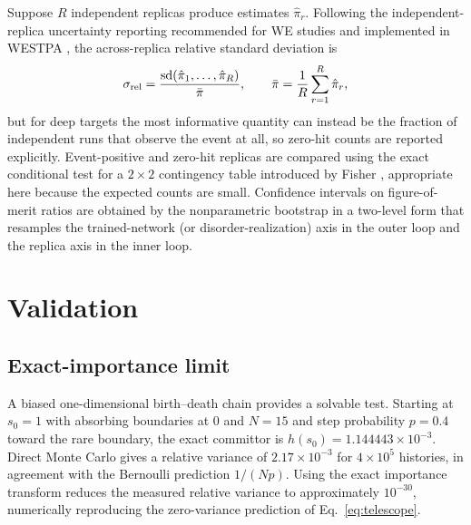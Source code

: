 \documentclass[a4paper,fleqn]{cas-sc}
\begin{document}
Suppose $R$ independent replicas produce estimates $\hat\pi_r$. Following the
independent-replica uncertainty reporting recommended for WE studies \citep{zuckerman2017} and
implemented in WESTPA \citep{russo2022}, the across-replica relative standard deviation is
\begin{equation}
\sigma_{\rm rel}=\frac{\mathrm{sd}(\hat\pi_1,\dots,\hat\pi_R)}{\bar\pi},\qquad
\bar\pi=\frac1R\sum_{r=1}^{R}\hat\pi_r ,
\label{eq:relsd}
\end{equation}
but for deep targets the most informative quantity can instead be the fraction of independent
runs that observe the event at all, so zero-hit counts are reported explicitly. Event-positive
and zero-hit replicas are compared using the exact conditional test for a $2\times2$
contingency table introduced by Fisher \citep{fisher1922}, appropriate here because the
expected counts are small. Confidence intervals on figure-of-merit ratios are obtained by the
nonparametric bootstrap \citep{efron1979} in a two-level form that resamples the
trained-network (or disorder-realization) axis in the outer loop and the replica axis in the
inner loop.

\FloatBarrier

\section{Validation}\label{sec:validation}

\subsection{Exact-importance limit}\label{sec:bd}
A biased one-dimensional birth--death chain provides a solvable test. Starting at $s_0=1$
with absorbing boundaries at $0$ and $N=15$ and step probability $p=0.4$ toward the rare
boundary, the exact committor is $h(s_0)=1.144443\times10^{-3}$. Direct Monte Carlo gives a
relative variance of $2.17\times10^{-3}$ for $4\times10^{5}$ histories, in agreement with the
Bernoulli prediction $1/(Np)$. Using the exact importance transform reduces the measured
relative variance to approximately $10^{-30}$, numerically reproducing the zero-variance
prediction of Eq.~\eqref{eq:telescope}.
\end{document}
